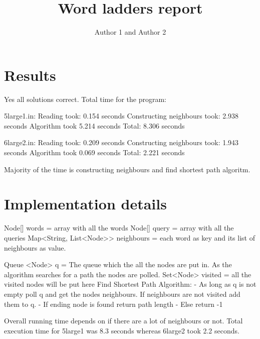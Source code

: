\documentclass{article}
\title{Word ladders report}
\author{Author 1 and Author 2}
\begin{document}
  \maketitle

  \section{Results}

  Yes all solutions correct.
  Total time for the program:

  5large1.in:
  Reading took: 0.154 seconds
  Constructing neighbours took: 2.938 seconds
  Algorithm took 5.214 seconds
  Total: 8.306 seconds

  6large2.in:
  Reading took: 0.209 seconds
  Constructing neighbours took: 1.943 seconds
  Algorithm took 0.069 seconds
  Total: 2.221 seconds

  Majority of the time is constructing neighbours and find shortest path algoritm.

  \section{Implementation details}


    Node[] words = array with all the words
    Node[] query = array with all the queries
    Map<String, List<Node>> neighbours = each word as key and its list of neighbours as value.

    Queue <Node> q = The queue which the all the nodes are put in. As the algorithm searches for a path the nodes are polled.
    Set<Node> visited = all the visited nodes will be put here
    Find Shortest Path Algorithm:
    - As long as q is not empty poll q and get the nodes neighbours. If neighbours are not visited add them to q.
    - If ending node is found return path length
    - Else return -1

    Overall running time depends on if there are a lot of neighbours or not.
    Total execution time for 5large1 was 8.3 seconds whereas 6large2 took 2.2 seconds.
\end{document}
